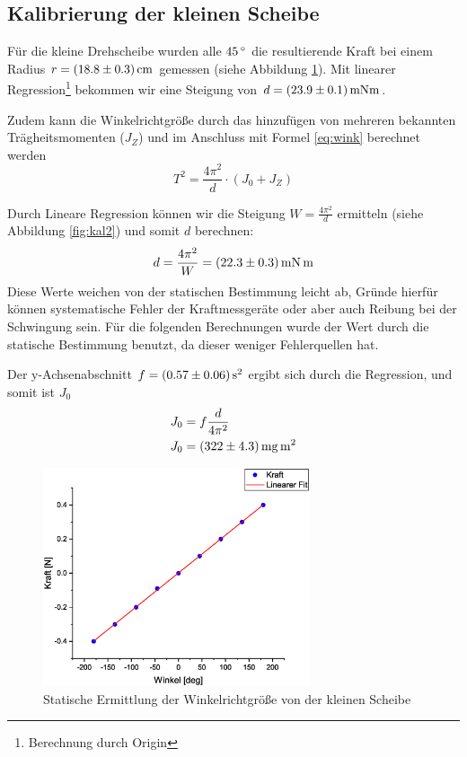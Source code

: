 \subsection{Kalibrierung der kleinen Scheibe}
Für die kleine Drehscheibe wurden alle $\unit[45]{^\circ}$ die resultierende Kraft bei einem Radius $r = \unit[(18.8 \pm 0.3)]{cm}$ gemessen (siehe Abbildung \ref{fig:kal1}). Mit linearer Regression\footnote{Berechnung durch Origin} bekommen wir eine Steigung von $d = \unit[(23.9 \pm 0.1)]{mN m}$.

Zudem kann die Winkelrichtgröße durch das hinzufügen von mehreren bekannten Trägheitsmomenten ($J_Z$) und im Anschluss mit Formel \ref{eq:wink} berechnet werden
\begin{equation}
T^2 = \frac{4\pi^2}{d}\cdot (J_0+J_Z)
\end{equation}

Durch Lineare Regression können wir die Steigung $W = \frac{4\pi^2}{d}$ ermitteln (siehe Abbildung \ref{fig:kal2}) und somit $d$ berechnen:
\begin{equation*}
d = \frac{4\pi^2}{W} = \unit[(22.3 \pm 0.3)]{mN \, m}
\end{equation*}
Diese Werte weichen von der statischen Bestimmung leicht ab, Gründe hierfür können systematische Fehler der Kraftmessgeräte oder aber auch Reibung bei der Schwingung sein. Für die folgenden Berechnungen wurde der Wert durch die statische Bestimmung benutzt, da dieser weniger Fehlerquellen hat.

Der y-Achsenabschnitt $f = \unit[(0.57 \pm 0.06)]{s^2}$ ergibt sich durch die Regression, und somit ist $J_0$
\begin{align}
J_0 &= f\frac{d}{4\pi^2}\\
J_0 &= \unit[(322 \pm 4.3)]{mg \, m^2}
\end{align}


\begin{figure}
\begin{center}
\includegraphics[width=0.7\textwidth]{Bilder/kal1.eps}
\caption{Statische Ermittlung der Winkelrichtgröße von der kleinen Scheibe}
\label{fig:kal1}
\end{center}
\end{figure}

